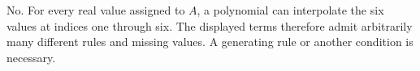 No. For every real value assigned to $A$, a polynomial can interpolate the six values at indices one through six. The displayed terms therefore admit arbitrarily many different rules and missing values. A generating rule or another condition is necessary.
